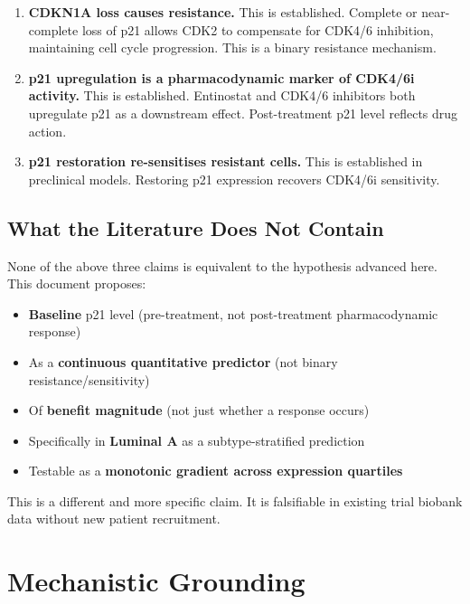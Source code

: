 \documentclass[12pt, a4paper]{article}
\begin{document}
\begin{enumerate}
    \item \textbf{CDKN1A loss causes resistance.}
    This is established. Complete or near-complete loss
    of p21 allows CDK2 to compensate for CDK4/6
    inhibition, maintaining cell cycle progression.
    This is a binary resistance mechanism.

    \item \textbf{p21 upregulation is a pharmacodynamic
    marker of CDK4/6i activity.}
    This is established. Entinostat and CDK4/6 inhibitors
    both upregulate p21 as a downstream effect.
    Post-treatment p21 level reflects drug action.

    \item \textbf{p21 restoration re-sensitises resistant
    cells.}
    This is established in preclinical models.
    Restoring p21 expression recovers CDK4/6i
    sensitivity.
\end{enumerate}

\subsection{What the Literature Does Not Contain}

None of the above three claims is equivalent to the
hypothesis advanced here. This document proposes:

\begin{itemize}
    \item \textbf{Baseline} p21 level (pre-treatment,
    not post-treatment pharmacodynamic response)
    \item As a \textbf{continuous quantitative predictor}
    (not binary resistance/sensitivity)
    \item Of \textbf{benefit magnitude} (not just
    whether a response occurs)
    \item Specifically in \textbf{Luminal A} as a
    subtype-stratified prediction
    \item Testable as a \textbf{monotonic gradient across
    expression quartiles}
\end{itemize}

This is a different and more specific claim. It is
falsifiable in existing trial biobank data without new
patient recruitment.

\section{Mechanistic Grounding}
\end{document}
